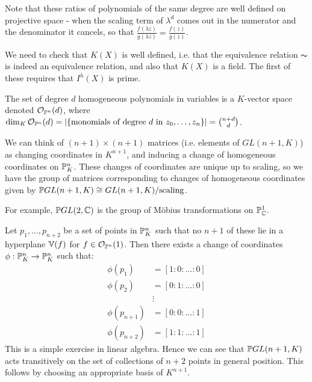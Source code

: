\documentclass[10pt,a4paper,rgb]{article}
\begin{document}
Note that these ratios of polynomials of the same degree are well defined on projective space - when the scaling term of $\lambda^d$ comes out in the numerator and the denominator it cancels, so that $\frac{f(\lambda z)}{g(\lambda z)} = \frac{f(z)}{g(z)}$.

We need to check that $K(X)$ is well defined, i.e. that the equivalence relation $\thicksim$ is indeed an equivalence relation, and also that $K(X)$ is a field. The first of these requires that $I^h(X)$ is prime.

The set of degree $d$ homogeneous polynomials in variables is a $K$-vector space denoted $\mathcal{O}_{\P^n}(d)$, where $\dim_K \mathcal{O}_{\P^n}(d) = |\{\text{monomials of degree $d$ in $z_0, \ldots, z_n$}\}| = \binom{n+d}{d}$.

We can think of $(n+1)\times(n+1)$ matrices (i.e. elements of $GL(n+1,K)$) as changing coordinates in $K^{n+1}$, and inducing a change of homogeneous coordinates on $\P^n_K$. These changes of coordinates are unique up to scaling, so we have the group of matrices corresponding to changes of homogeneous coordinates given by $\P GL(n+1, K) \cong GL(n+1, K)/\text{scaling}$.

For example, $\P GL(2, \C)$ is the group of M\"obius transformations on $\P^1_\C$.

Let $p_1, \ldots, p_{n+2}$ be a set of points in $\P^n_K$ such that no $n+1$ of these lie in a hyperplane $\V(f)$ for $f \in \mathcal{O}_{\P^n}(1)$. Then there exists a change of coordinates $\phi : \P^n_K \to \P^n_K$ such that:
\begin{align*}
\phi(p_1) &= [1:0:\ldots:0]\\
\phi(p_2) &= [0:1:\ldots:0]\\
&\vdots\\
\phi(p_{n+1}) &= [0:0:\ldots:1]\\
\phi(p_{n+2}) &= [1:1:\ldots:1]
\end{align*}
This is a simple exercise in linear algebra. Hence we can see that $\P GL(n+1, K)$ acts transitively on the set of collections of $n+2$ points in general position. This follows by choosing an appropriate basis of $K^{n+1}$.
\end{document}
